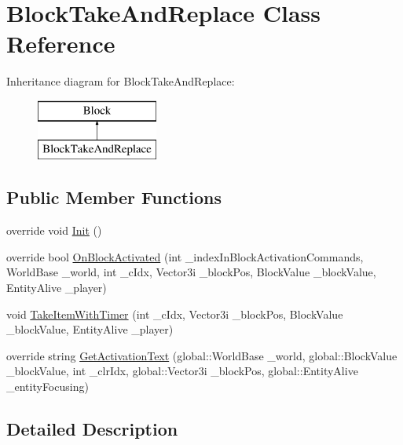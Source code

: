 \hypertarget{class_block_take_and_replace}{}\section{Block\+Take\+And\+Replace Class Reference}
\label{class_block_take_and_replace}
Inheritance diagram for Block\+Take\+And\+Replace\+:\begin{figure}[H]
\begin{center}
\leavevmode
\includegraphics[height=2.000000cm]{class_block_take_and_replace}
\end{center}
\end{figure}
\subsection*{Public Member Functions}
\begin{DoxyCompactItemize}
\item 
override void \mbox{\hyperlink{class_block_take_and_replace_a2ca56402006143682cadc4b7d6b20d17}{Init}} ()
\item 
override bool \mbox{\hyperlink{class_block_take_and_replace_af23451b48625362fa68560fed6655440}{On\+Block\+Activated}} (int \+\_\+index\+In\+Block\+Activation\+Commands, World\+Base \+\_\+world, int \+\_\+c\+Idx, Vector3i \+\_\+block\+Pos, Block\+Value \+\_\+block\+Value, Entity\+Alive \+\_\+player)
\item 
void \mbox{\hyperlink{class_block_take_and_replace_aaf0c8d63af712312d2d0c97fbb94682d}{Take\+Item\+With\+Timer}} (int \+\_\+c\+Idx, Vector3i \+\_\+block\+Pos, Block\+Value \+\_\+block\+Value, Entity\+Alive \+\_\+player)
\item 
override string \mbox{\hyperlink{class_block_take_and_replace_af4a8e2aeb473d7f8eca262210128b9b1}{Get\+Activation\+Text}} (global\+::\+World\+Base \+\_\+world, global\+::\+Block\+Value \+\_\+block\+Value, int \+\_\+clr\+Idx, global\+::\+Vector3i \+\_\+block\+Pos, global\+::\+Entity\+Alive \+\_\+entity\+Focusing)
\end{DoxyCompactItemize}


\subsection{Detailed Description}


